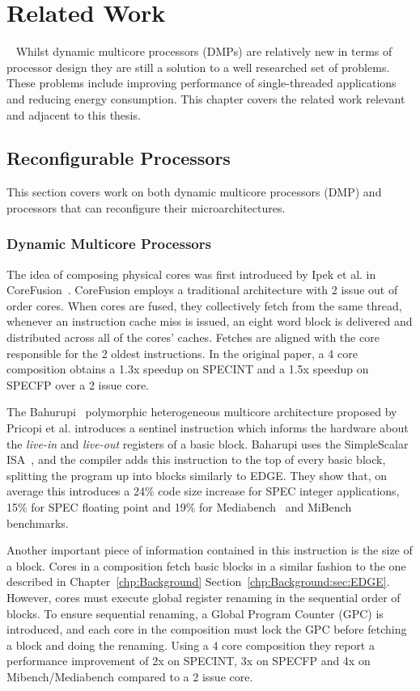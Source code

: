\chapter{Related Work}~\label{chp:rw}
Whilst dynamic multicore processors (DMPs) are relatively new in terms of processor design they are still a solution to a well researched set of problems.
These problems include improving performance of single-threaded applications and reducing energy consumption.
This chapter covers the related work relevant and adjacent to this thesis.
\vspace{-3em}
\section{Reconfigurable Processors}

This section covers work on both dynamic multicore processors (DMP) and processors that can reconfigure their microarchitectures.
\vspace{-1em}
\subsection{Dynamic Multicore Processors}
The idea of composing physical cores was first introduced by Ipek et al. in CoreFusion~\cite{ipek2007CoreFusion}.
CoreFusion employs a traditional architecture with 2 issue out of order cores.
When cores are fused, they collectively fetch from the same thread, whenever an instruction cache miss is issued, an eight word block is delivered and distributed across all of the cores' caches.
Fetches are aligned with the core responsible for the 2 oldest instructions.
In the original paper, a 4 core composition obtains a 1.3x speedup on SPECINT and a 1.5x speedup on SPECFP over a 2 issue core.
 
The Bahurupi~\cite{pricopi2012bahurupi} polymorphic heterogeneous multicore architecture proposed by Pricopi et al. introduces a sentinel instruction which informs the hardware about the \textit{live-in} and \textit{live-out} registers of a basic block.
Baharupi uses the SimpleScalar ISA~\cite{burger1997simplescalar}, and the compiler adds this instruction to the top of every basic block, splitting the program up into blocks similarly to EDGE.
They show that, on average this introduces a 24\% code size increase for SPEC integer applications, 15\% for SPEC floating point and 19\% for Mediabench~\cite{mediabench} and MiBench~\cite{mibench} benchmarks.

Another important piece of information contained in this instruction is the size of a block.
Cores in a composition fetch basic blocks in a similar fashion to the one described in Chapter~\ref{chp:Background} Section~\ref{chp:Background:sec:EDGE}.
However, cores must execute global register renaming in the sequential order of blocks.
To ensure sequential renaming, a Global Program Counter (GPC) is introduced, and each core in the composition must lock the GPC before fetching a block and doing the renaming.%
Using a 4 core composition they report a performance improvement of 2x on SPECINT, 3x on SPECFP and 4x on Mibench/Mediabench compared to a 2 issue core. 

